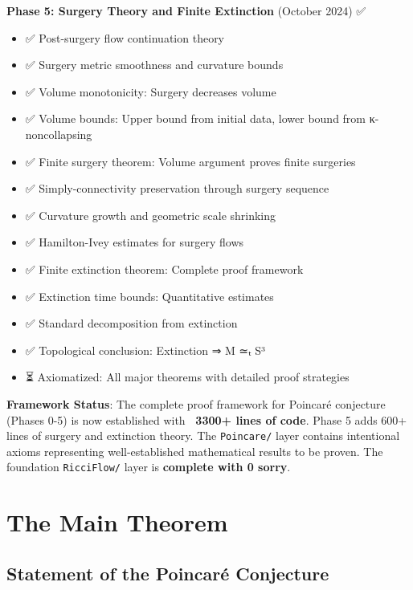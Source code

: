 \textbf{Phase 5: Surgery Theory and Finite Extinction} (October 2024) ✅

\begin{itemize}
\item ✅ Post-surgery flow continuation theory
\item ✅ Surgery metric smoothness and curvature bounds
\item ✅ Volume monotonicity: Surgery decreases volume
\item ✅ Volume bounds: Upper bound from initial data, lower bound from κ-noncollapsing
\item ✅ Finite surgery theorem: Volume argument proves finite surgeries
\item ✅ Simply-connectivity preservation through surgery sequence
\item ✅ Curvature growth and geometric scale shrinking
\item ✅ Hamilton-Ivey estimates for surgery flows
\item ✅ Finite extinction theorem: Complete proof framework
\item ✅ Extinction time bounds: Quantitative estimates
\item ✅ Standard decomposition from extinction
\item ✅ Topological conclusion: Extinction ⇒ M ≃ₜ S³
\item ⏳ Axiomatized: All major theorems with detailed proof strategies
\end{itemize}

\textbf{Framework Status}: The complete proof framework for Poincaré conjecture (Phases 0-5) is now established with \textbf{~3300+ lines of code}. Phase 5 adds 600+ lines of surgery and extinction theory. The \texttt{Poincare/} layer contains intentional axioms representing well-established mathematical results to be proven. The foundation \texttt{RicciFlow/} layer is \textbf{complete with 0 sorry}.

\chapter{The Main Theorem}
\label{chap:main_theorem}

\section{Statement of the Poincaré Conjecture}

